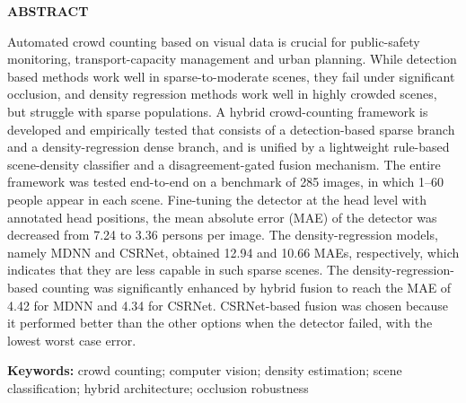 
\begin{center}
	{\Large\bfseries ABSTRACT}
\end{center}

Automated crowd counting based on visual data is crucial for public-safety monitoring, transport-capacity management and urban planning. While detection based methods work well in sparse-to-moderate scenes, they fail under significant occlusion, and density regression methods work well in highly crowded scenes, but struggle with sparse populations. A hybrid crowd-counting framework is developed and empirically tested that consists of a detection-based sparse branch and a density-regression dense branch, and is unified by a lightweight rule-based scene-density classifier and a disagreement-gated fusion mechanism. The entire framework was tested end-to-end on a benchmark of 285 images, in which 1–60 people appear in each scene. Fine-tuning the detector at the head level with annotated head positions, the mean absolute error (MAE) of the detector was decreased from 7.24 to 3.36 persons per image. The density-regression models, namely MDNN and CSRNet, obtained 12.94 and 10.66 MAEs, respectively, which indicates that they are less capable in such sparse scenes. The density-regression-based counting was significantly enhanced by hybrid fusion to reach the MAE of 4.42 for MDNN and 4.34 for CSRNet. CSRNet-based fusion was chosen because it performed better than the other options when the detector failed, with the lowest worst case error.

\noindent\textbf{Keywords:} crowd counting; computer vision; density estimation; scene classification; hybrid architecture; occlusion robustness

\clearpage